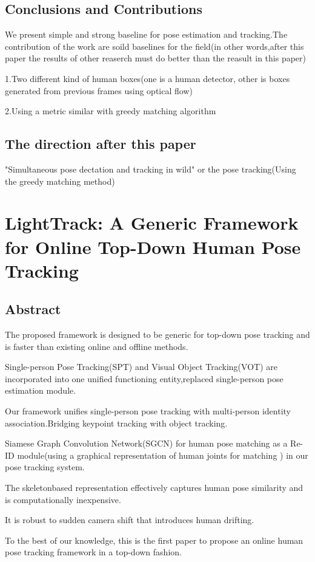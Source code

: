 \documentclass[11pt]{article}
\begin{document}
\subsection{Conclusions and Contributions}

We present simple and strong baseline for pose estimation and tracking.The contribution of the work are soild baselines for the field(in other words,after this paper the results of other reaserch must do better than the reasult in this paper)

1.Two different kind of human boxes(one is a human detector, other is boxes generated from previous frames using optical flow)

2.Using a metric similar with greedy matching algorithm
\subsection{The direction after this paper}

"Simultaneous pose dectation and tracking in wild" or the pose tracking(Using the greedy matching method) 
\section{LightTrack: A Generic Framework for Online Top-Down Human Pose Tracking}
\subsection{Abstract}
The proposed framework is designed to be generic for top-down pose tracking and is faster than existing online and offline methods.

Single-person Pose Tracking(SPT) and Visual Object Tracking(VOT) are incorporated into one unified functioning entity,replaced single-person pose estimation module.

Our framework unifies single-person pose tracking with multi-person identity association.Bridging keypoint tracking with object tracking.

Siamese Graph Convolution Network(SGCN) for human pose matching as a Re-ID module(using a graphical representation of human joints for matching ) in our pose tracking system.

The skeletonbased representation effectively captures human pose similarity and is computationally inexpensive.

It is robust to sudden camera shift that introduces human drifting.

To the best of our knowledge, this is the first paper to propose an online human pose tracking framework in a top-down fashion.
\end{document}

